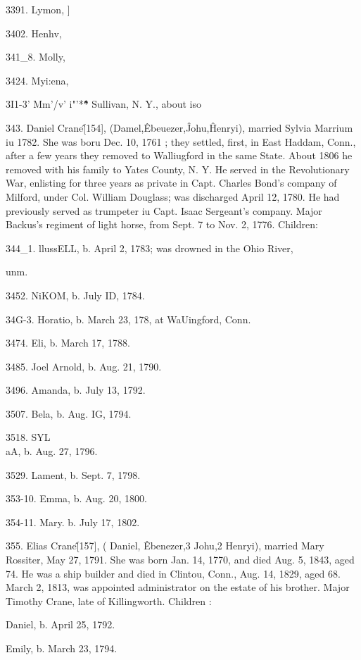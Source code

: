 3391. Lymon, ] 

3402. Henhv, 

341\_8. Molly, 

3424. Myi:ena, 



3I1-3' Mm'/v' i"'*\^\^\^ \^\^\^ * Sullivan, N. Y., about iso 




343. Daniel Crane\^ [154], (Damel,\^ Ebeuezer,\^ Johu,\^ 
Henryi), married Sylvia Marrium iu 1782. She was boru Dec. 
10, 1761 ; they settled, first, in East Haddam, Conn., after a few 
years they removed to Walliugford in the same State. About 
1806 he removed with his family to Yates County, N. Y. He 
served in the Revolutionary War, enlisting for three years as 
private in Capt. Charles Bond's company of Milford, under Col. 
William Douglass; was discharged April 12, 1780. He had 
previously served as trumpeter iu Capt. Isaac Sergeant's company. 
Major Backus's regiment of light horse, from Sept. 7 to Nov. 2, 
1776. Children: 

344\_1. llussELL, b. April 2, 1783; was drowned in the Ohio River, 

unm. 

3452. NiKOM, b. July ID, 1784. 

34G-3. Horatio, b. March 23, 178, at WaUingford, Conn. 

3474. Eli, b. March 17, 1788. 

3485. Joel Arnold, b. Aug. 21, 1790. 

3496. Amanda, b. July 13, 1792. 

3507. Bela, b. Aug. IG, 1794. 

3518. SYL\\aA, b. Aug. 27, 1796. 

3529. Lament, b. Sept. 7, 1798. 

353-10. Emma, b. Aug. 20, 1800. 

354-11. Mary. b. July 17, 1802. 

355. Elias Crane\^ [157], ( Daniel, \^ Ebenezer,3 Johu,2 
Henryi), married Mary Rossiter, May 27, 1791. She was born 
Jan. 14, 1770, and died Aug. 5, 1843, aged 74. He was a ship 
builder and died in Clintou, Conn., Aug. 14, 1829, aged 68. 
March 2, 1813, was appointed administrator on the estate of his 
brother. Major Timothy Crane, late of Killingworth. Children : 

Daniel, b. April 25, 1792. 

Emily, b. March 23, 1794. 

